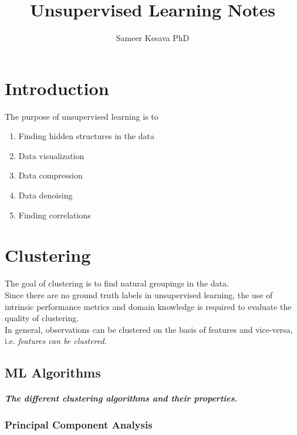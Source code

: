 \documentclass[a4paper, 12pt]{report}
\begin{document}
\title{Unsupervised Learning Notes}
\author{Sameer Kesava PhD}
\date{} %
\maketitle

\tableofcontents
\newpage



\chapter{Introduction}
The purpose of unsupervised learning is to
\begin{enumerate}
\item Finding hidden structures in the data
\item Data visualization
\item Data compression
\item Data denoising
\item Finding correlations
\end{enumerate}

\chapter{Clustering}
The goal of clustering is to find natural groupings in the data.
\\

Since there are no ground truth labels in unsupervised learning, the use of intrinsic performance metrics and domain knowledge is required to evaluate the quality of clustering.\\

In general, observations can be clustered on the basis of features and vice-versa, i.e. \textit{features can be clustered}.
\section{ML Algorithms}
\paragraph{The different clustering algorithms and their properties.}

\subsection{Principal Component Analysis}
\label{PCA}
\end{document}
